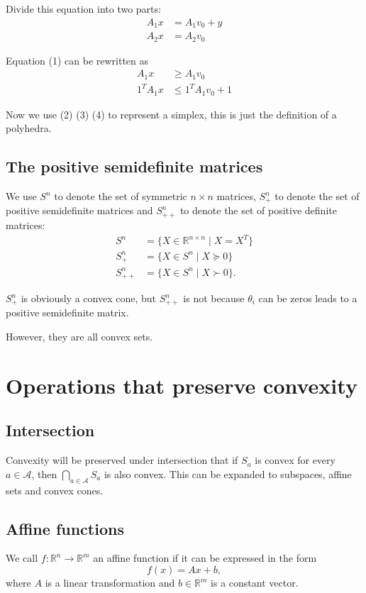 \documentclass[lang=en,color=blue,mode=fancy,titlestyle=hang]{elegantbook}
\begin{document}
Divide this equation into two parts:
\begin{align}
A_1x &= A_1 v_0 + y \\
A_2x &= A_2 v_0
\end{align}

Equation (1) can be rewritten as
\begin{align}
A_1x &\geq A_1 v_0 \\
1^{T}A_1x &\leq 1^{T}A_1 v_0 + 1
\end{align}

Now we use (2) (3) (4) to represent a simplex, this is just the definition of a polyhedra.

\subsection{The positive semidefinite matrices}

We use $S^n$ to denote the set of symmetric $n \times n$ matrices, $S^n_+$ to denote
the set of positive semidefinite matrices and $S^n_{++}$ to denote the set of positive
definite matrices:
\begin{align*}
S^n &= \{X \in \mathbb{R}^{n \times n} \;|\; X = X^{T}\} \\
S^n_+ &= \{X \in S^n \;|\; X \succeq 0\} \\
S^n_{++} &= \{X \in S^n \;|\; X \succ 0\}.
\end{align*}

$S^n_+$ is obviously a convex cone, but $S^n_{++}$ is not because $\theta_i$ can be zeros
leads to a positive semidefinite matrix.

However, they are all convex sets.

\section{Operations that preserve convexity}
\subsection{Intersection}
Convexity will be preserved under intersection that if $S_a$ is convex for every
$a \in \mathcal{A}$, then $\bigcap_{a \in \mathcal{A}} S_a$ is also convex. This can be
expanded to subspaces, affine sets and convex cones.

\subsection{Affine functions}
We call $f: \mathbb{R}^n \rightarrow \mathbb{R}^m$ an affine function if it can be expressed
in the form
\[
f(x) = Ax + b,
\]
where $A$ is a linear transformation and $b \in \mathbb{R}^m$ is a constant vector. 
\end{document}
